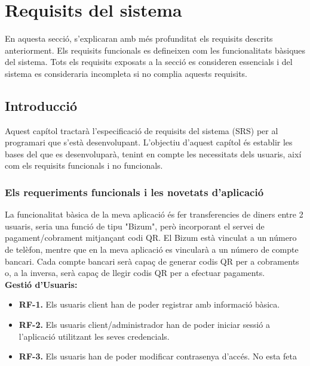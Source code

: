 \documentclass[a4paper,12pt,twoside]{ThesisStyle}
\begin{document}
\chapter{Requisits del sistema}
\label{chp:requisits}

En aquesta secció, s'explicaran amb més profunditat els requisits descrits anteriorment.
Els requisits funcionals es defineixen com les funcionalitats bàsiques del sistema.
Tots els requisits exposats a la secció es consideren essencials i del sistema
es consideraria incompleta si no complia aquests requisits.






\section{Introducció}
\label{subsec:Introducció}

Aquest capítol tractarà l'especificació de requisits del sistema (SRS) per al programari que s'està desenvolupant. L'objectiu d'aquest capítol és establir les bases del que es desenvoluparà, tenint en compte les necessitats dels usuaris, així com els requisits funcionals i no funcionals.


\subsection{Els requeriments funcionals i les novetats d'aplicació}
\label{subsec:Els requeriments funcionals i les novetats d'aplicació}


La funcionalitat bàsica de la meva aplicació és fer transferencies de diners entre 2 usuaris, 
seria una funció de tipu "Bizum", però incorporant el servei de pagament/cobrament mitjançant codi QR. El Bizum està vinculat a un número de telèfon, mentre que en la meva aplicació es vincularà a un número de compte bancari. Cada compte bancari serà capaç de generar codis QR per a cobraments o, a la inversa, serà capaç de llegir codis QR per a efectuar pagaments.\\



\textbf{Gestió d'Usuaris:}
\begin{itemize}
    \item \textbf{RF-1.} Els usuaris client han de poder registrar amb informació bàsica.
    \item \textbf{RF-2.} Els usuaris client/administrador han de poder iniciar sessió a l'aplicació utilitzant les seves credencials.
    \item \textbf{RF-3.} Els usuaris han de poder modificar contrasenya d'accés. No esta feta
\end{itemize}
\end{document}
